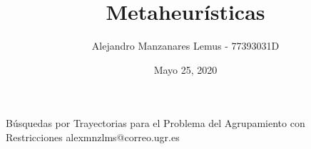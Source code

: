 \documentclass[10pt]{report}
\author{Alejandro Manzanares Lemus - 77393031D}
\title{Metaheurísticas}
\date{Mayo 25, 2020}
\begin{document}
				{Búsquedas por Trayectorias para el Problema del Agrupamiento con Restricciones}
            {alexmnzlms@correo.ugr.es}

\tableofcontents

% 
% 
% 
% 
% 

% 
% 
% 
% 
% 
% 
% 
% 
% 
% 
% 




% 
% 





% 


\end{document}
